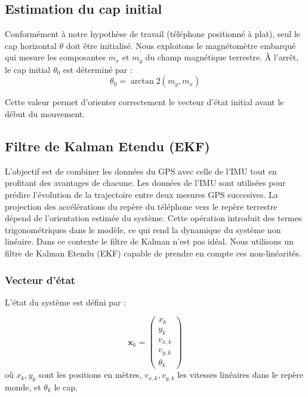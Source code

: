 \documentclass{article}
\begin{document}
\subsection{Estimation du cap initial}
Conformément à notre hypothèse de travail (téléphone positionné à plat), seul le cap horizontal $\theta$ doit être initialisé. Nous exploitons le magnétomètre embarqué qui mesure les composantes $m_x$ et $m_y$ du champ magnétique terrestre. À l'arrêt, le cap initial $\theta_0$ est déterminé par :
\[
\theta_0 = \arctan2(m_y, m_x)
\]

Cette valeur permet d'orienter correctement le vecteur d'état initial avant le début du mouvement. 

\subsection{Filtre de Kalman Etendu (EKF)}
L'objectif est de combiner les données du GPS avec celle de l'IMU tout en profitant des avantages de chacune. Les données de l'IMU sont utilisées pour prédire l'évolution de la trajectoire entre deux mesures GPS succesives. La projection des accélérations du repère du téléphone vers le repère terrestre dépend de l'orientation estimée du système. Cette opération introduit des termes trigonométriques dans le modèle, ce qui rend la dynamique du système non linéaire. Dans ce contexte le filtre de Kalman n'est pas idéal. Nous utilisons un filtre de Kalman Etendu (EKF) capable de prendre en compte ces non-linéarités. 

\subsubsection{Vecteur d'état}

L'état du système est défini par :

\[
\mathbf{x}_k = \begin{pmatrix} x_k \\ y_k \\ v_{x,k} \\ v_{y,k} \\ \theta_k \end{pmatrix}
\]
où $x_k, y_k$ sont les positions en mètres, $v_{x,k}, v_{y,k}$ les vitesses linéaires dans le repère monde, et $\theta_k$ le cap.
\end{document}

